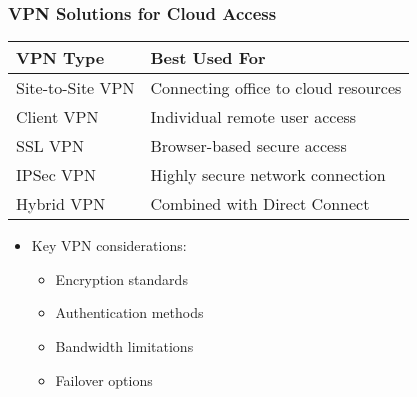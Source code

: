 \documentclass{beamer}
\begin{document}
\begin{frame}
    \frametitle{VPN Solutions for Cloud Access}
    
    \begin{tabular}{|p{}|p{}|}
        \hline
        \textbf{VPN Type} & \textbf{Best Used For} \\
        \hline
        Site-to-Site VPN & Connecting office to cloud resources \\
        \hline
        Client VPN & Individual remote user access \\
        \hline
        SSL VPN & Browser-based secure access \\
        \hline
        IPSec VPN & Highly secure network connection \\
        \hline
        Hybrid VPN & Combined with Direct Connect \\
        \hline
    \end{tabular}
    
    \begin{itemize}
        \item Key VPN considerations:
        \begin{itemize}
            \item Encryption standards
            \item Authentication methods
            \item Bandwidth limitations
            \item Failover options
        \end{itemize}
    \end{itemize}
\end{frame}
\end{document}
